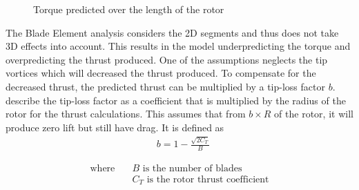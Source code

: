 \begin{figure}[h]
\begin{minipage}{0.45\textwidth}
                \caption{Torque predicted over the length of the rotor}
                \label{fig: torque_over_radius}
            \end{minipage}
        \end{figure}


        The Blade Element analysis considers the 2D segments and thus does not take 3D effects into account. This results in the model underpredicting the torque and overpredicting the thrust produced. One of the assumptions neglects the tip vortices which will decreased the thrust produced. To compensate for the decreased thrust, the predicted thrust can be multiplied by a tip-loss factor \(b\). \cite{AflredAerodynamicsOfHelicopters} describe the tip-loss factor as a coefficient that is multiplied by the radius of the rotor for the thrust calculations. This assumes that from \(b\times R\) of the rotor, it will produce zero lift but still have drag. It is defined as 
            \begin{align}
                &b = 1 -\frac{\sqrt{2C_T}}{B}
            \end{align}
            \begin{minipage}{0.45\textwidth}
                \vspace*{-8mm}
                \begin{align*}
                    \text{where} \quad
                    &B  \text{ is the number of blades} \\
                    &C_T  \text{ is the rotor thrust coefficient}
                \end{align*}
                \end{minipage}
                \\
                
